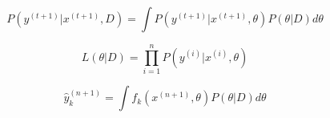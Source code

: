 \documentclass[11pt]{article}
\begin{document}





        \begin{equation} \label{predictiveProbDist}
            P(y^{(t+1)}| x^{(t+1)}, D) = \int P(y^{(t+1)}| x^{(t+1)},\theta) P (\theta| D) d\theta
        \end{equation}

        \begin{equation}
             L(\theta|  D) =  \prod_{i=1}^n P(y^{(i)}| x^{(i)}, \theta)
        \end{equation}



        \begin{equation}\label{predictiveSingleValueSQLoss}
            \hat{y}_k^{(n+1)} = \int f_k(x^{(n+1)}, \theta) P(\theta| D) d\theta
        \end{equation}
\end{document}
